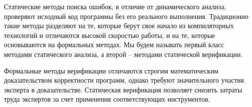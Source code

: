 Статические методы поиска ошибок, в отличие от динамического анализа, проверяют исходный код программы без его реального выполнения. 
Традиционно такие методы разделяют на те, которые берут свое начало из компиляторных технологий и отличаются высокой скоростью работы, и на те, которые основываются на формальных методах.
Мы будем называть первый класс методами статического анализа, а второй -- методами статической верификации.

Формальные методы верификации отличаются строгим математическим доказательством корректности программ, однако требуют значительного участия эксперта в доказательстве.
Статическая верификация позволяет снизить затраты труда экспертов за счет применения соответствующих инструментов.



